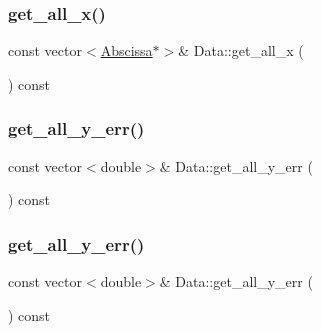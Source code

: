 \mbox{\label{classData_a79204577812567531adde90797885b3e}} 
\subsubsection{\texorpdfstring{get\_all\_x()}{get\_all\_x()}\hspace{0.1cm}{\footnotesize\ttfamily [2/2]}}
{\footnotesize\ttfamily const vector$<$\mbox{\hyperlink{classAbscissa}{Abscissa}}$\ast$$>$\& Data\+::get\+\_\+all\+\_\+x (\begin{DoxyParamCaption}{ }\end{DoxyParamCaption}) const\hspace{0.3cm}{\ttfamily [inline]}}

\mbox{\label{classData_ad4988122408ff487d5f891a9b04b3c83}} 
\subsubsection{\texorpdfstring{get\_all\_y\_err()}{get\_all\_y\_err()}\hspace{0.1cm}{\footnotesize\ttfamily [1/2]}}
{\footnotesize\ttfamily const vector$<$double$>$\& Data\+::get\+\_\+all\+\_\+y\+\_\+err (\begin{DoxyParamCaption}{ }\end{DoxyParamCaption}) const\hspace{0.3cm}{\ttfamily [inline]}}

\mbox{\label{classData_ad4988122408ff487d5f891a9b04b3c83}} 
\subsubsection{\texorpdfstring{get\_all\_y\_err()}{get\_all\_y\_err()}\hspace{0.1cm}{\footnotesize\ttfamily [2/2]}}
{\footnotesize\ttfamily const vector$<$double$>$\& Data\+::get\+\_\+all\+\_\+y\+\_\+err (\begin{DoxyParamCaption}{ }\end{DoxyParamCaption}) const\hspace{0.3cm}{\ttfamily [inline]}}

